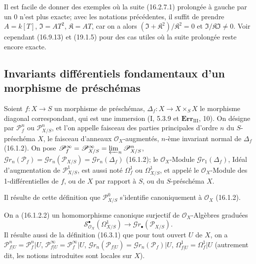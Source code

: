 Il est facile de donner des exemples où la suite (16.2.7.1) prolongée à gauche
par un 0 n'est plus exacte; avec les notations précédentes, il suffit de
prendre $A=k[T]$, $\mathfrak{I}=AT^2$, $\mathfrak{K}=AT$, car on a alors
$(\mathfrak{I}+\mathfrak{K}^2)/\mathfrak{K}^2=0$ et
$\mathfrak{I}/\mathfrak{K}\mathfrak{I}\neq 0$. Voir cependant (16.9.13) et
(19.1.5) pour des cas utiles où la suite prolongée reste encore exacte.

\subsection{Invariants différentiels fondamentaux d'un morphisme de préschémas}

\begin{definition}[16.3.1]
Soient $f:X\to S$ un morphisme de préschémas, $\Delta_f:X\to X\times_S X$
le morphisme diagonal correspondant, qui est une immersion (I, 5.3.9 et
$\mathbf{Err}_{\mathrm{III}}$, 10). On désigne par $\mathscr{P}_f^n$ ou
$\mathscr{P}_{X/S}^n$, et l'on appelle faisceau des parties principales d'ordre $n$
du $S$-préschéma $X$, le faisceau d'anneaux $\mathcal{O}_X$-augmentés, $n$-ème
invariant normal de $\Delta_f$ (16.1.2). On pose
$\mathscr{P}_f^\infty=\mathscr{P}_{X/S}^\infty=
\varprojlim_n\mathscr{P}_{X/S}^n$,
$\mathscr{G}r_n(\mathscr{P}_f)=\mathscr{G}r_n(\mathscr{P}_{X/S})=
\mathscr{G}r_n(\Delta_f)$ (16.1.2); le $\mathcal{O}_X$-Module
$\mathscr{G}r_1(\Delta_f)$, Idéal d'augmentation de $\mathscr{P}_{X/S}^1$, est
aussi noté $\Omega_f^1$ ou $\Omega_{X/S}^1$, et appelé le $\mathcal{O}_X$-Module
des 1-différentielles de $f$, ou de $X$ par rapport à $S$, ou du $S$-préschéma $X$.
\end{definition}

Il résulte de cette définition que $\mathscr{P}_{X/S}^0$ s'identifie
canoniquement à $\mathcal{O}_X$ (16.1.2).

On a (16.1.2.2) un homomorphisme canonique surjectif de
$\mathcal{O}_X$-Algèbres graduées
\[
  \mathscr{S}_{\mathcal{O}_X}^{\bullet}(\Omega_{X/S}^1)
  \longrightarrow\mathscr{G}r_\bullet(\mathscr{P}_{X/S}).
  \tag{16.3.1.1}
  \label{IV.16.3.1.1}
\]
Il résulte aussi de la définition (16.3.1) que pour tout ouvert $U$ de $X$, on a
$\mathscr{P}_{f|U}^n=\mathscr{P}_f^n|U$,
$\mathscr{P}_{f|U}^\infty=\mathscr{P}_f^\infty|U$,
$\mathscr{G}r_n(\mathscr{P}_{f|U})=\mathscr{G}r_n(\mathscr{P}_f)|U$,
$\Omega_{f|U}^1=\Omega_f^1|U$ (autrement dit, les notions introduites sont
locales sur $X$).

